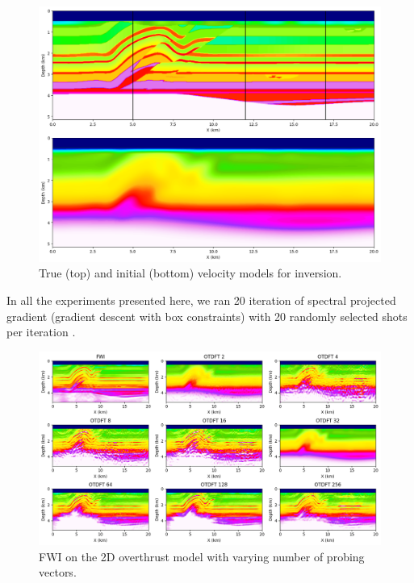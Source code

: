 \documentclass[]{segabs}
\begin{document}
\begin{figure}
\centering
\includegraphics[width=1.000\hsize]{./figures/init.png}
\caption*{True (top) and initial (bottom) velocity models for
inversion.}
\end{figure}

In all the experiments presented here, we ran 20 iteration of spectral
projected gradient (gradient descent with box constraints)
\citep{schmidt09a} with 20 randomly selected shots per iteration
\citep{Aravkin11TRridr}.

\begin{figure}
\centering
\includegraphics[width=1.000\hsize]{./figures/DFT_fwi.png}
\caption*{FWI on the 2D overthrust model with varying number of probing
vectors.}
\end{figure}
\end{document}

